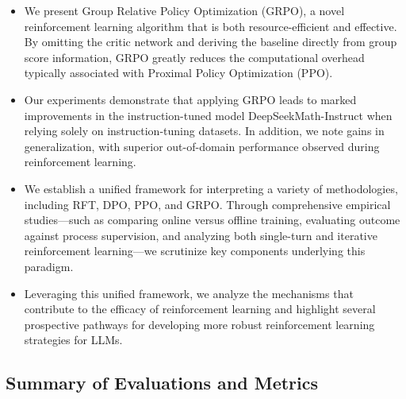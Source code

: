 \begin{itemize}[topsep=0pt]
    \item We present Group Relative Policy Optimization (GRPO), a novel reinforcement learning algorithm that is both resource-efficient and effective. By omitting the critic network and deriving the baseline directly from group score information, GRPO greatly reduces the computational overhead typically associated with Proximal Policy Optimization (PPO).
    \item Our experiments demonstrate that applying GRPO leads to marked improvements in the instruction-tuned model DeepSeekMath-Instruct when relying solely on instruction-tuning datasets. In addition, we note gains in generalization, with superior out-of-domain performance observed during reinforcement learning.
    \item We establish a unified framework for interpreting a variety of methodologies, including RFT, DPO, PPO, and GRPO. Through comprehensive empirical studies—such as comparing online versus offline training, evaluating outcome against process supervision, and analyzing both single-turn and iterative reinforcement learning—we scrutinize key components underlying this paradigm.
    \item Leveraging this unified framework, we analyze the mechanisms that contribute to the efficacy of reinforcement learning and highlight several prospective pathways for developing more robust reinforcement learning strategies for LLMs.
\end{itemize}

\subsection{Summary of Evaluations and Metrics}

